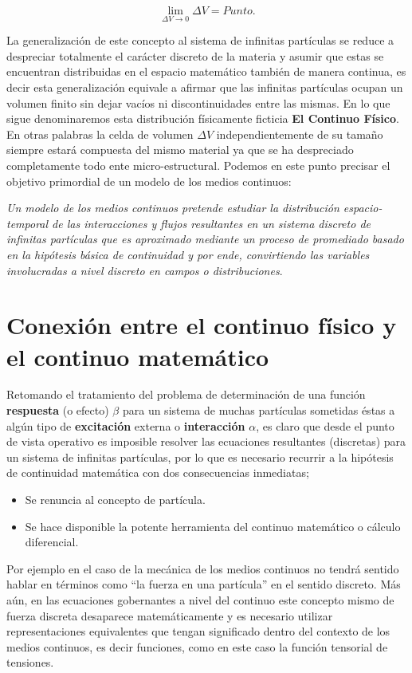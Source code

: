 \documentclass[../notas medios.tex]{subfiles}
\begin{document}
\begin{equation}
\mathop {\lim }\limits_{\Delta V \to 0} \Delta V = Punto.
\label{lim_point}
\end{equation}

La generalización de este concepto al sistema de infinitas partículas se reduce a despreciar totalmente el carácter discreto de la materia y asumir que estas se encuentran distribuidas en el espacio matemático también de manera continua, es decir esta generalización equivale a afirmar que las infinitas partículas ocupan un volumen finito sin dejar vacíos ni discontinuidades entre las mismas. En lo que sigue denominaremos esta distribución físicamente ficticia {\bf El Continuo Físico}.  En otras palabras la celda de volumen $\Delta V$   independientemente de su tamaño siempre estará compuesta del mismo material ya que se ha despreciado completamente todo ente micro-estructural.  Podemos en este punto precisar el objetivo primordial de un modelo de los medios continuos:

\textit {Un modelo de los medios continuos pretende estudiar la distribución espacio-temporal de las interacciones   y flujos   resultantes en un sistema discreto de infinitas partículas que es aproximado mediante un proceso de promediado basado en la hipótesis básica de continuidad y por ende, convirtiendo las variables involucradas a nivel discreto en campos o distribuciones}.

\section{Conexión entre el continuo físico y el continuo matemático}
Retomando el tratamiento del problema de determinación de una función {\bf
respuesta} (o efecto) $\beta$ para un sistema de muchas partículas sometidas
éstas a algún tipo de {\bf excitación} externa o {\bf interacción} $\alpha$, es
claro que desde el punto de vista operativo es imposible resolver las ecuaciones
resultantes (discretas) para un sistema de infinitas partículas, por lo que es necesario recurrir a la hipótesis de continuidad matemática con dos consecuencias inmediatas;
\begin{itemize}
\item Se renuncia al concepto de partícula.
\item Se hace disponible la potente herramienta del continuo matemático o
cálculo diferencial.
\end{itemize}
%
Por ejemplo en el caso de la mecánica de los medios continuos no tendrá sentido
hablar en términos como “la fuerza en una partícula” en el sentido discreto. 
Más aún, en las ecuaciones gobernantes a nivel del continuo este concepto mismo de fuerza discreta desaparece matemáticamente y es necesario utilizar representaciones equivalentes que tengan significado dentro del contexto de los medios continuos, es decir funciones, como en este caso la función tensorial de tensiones.
\end{document}
